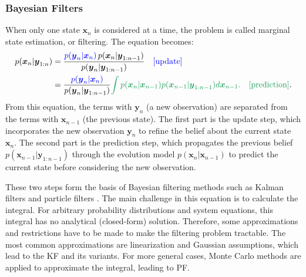 \subsubsection{Bayesian Filters}
\label{sec:bayesfilter}
When only one state $\boldsymbol{x}_{n}$ is considered at a time, the problem is called marginal state estimation, or filtering. The equation becomes:
\begin{equation}
    \label{eq:bayesfilter}
    \begin{split}
        p(\boldsymbol{x}_{n}|\boldsymbol{y}_{1:n})&=\frac{\textcolor{blue}{p(\boldsymbol{y}_n|\boldsymbol{x}_n)}\,p(\boldsymbol{x}_{n}|\boldsymbol{y}_{1:n-1})}{p(\boldsymbol{y}_n|\boldsymbol{y}_{1:n-1})} \quad\text{\textcolor{blue}{[update]}}\\
        &=\frac{\textcolor{blue}{p(\boldsymbol{y}_n|\boldsymbol{x}_n)}}{p(\boldsymbol{y}_n|\boldsymbol{y}_{1:n-1})}\textcolor{ForestGreen}{\int p(\boldsymbol{x}_{n}|\boldsymbol{x}_{n-1})p(\boldsymbol{x}_{n-1}|\boldsymbol{y}_{1:n-1})d\boldsymbol{x}_{n-1}.} \quad\text{\textcolor{ForestGreen}{[prediction]}}.
    \end{split}
\end{equation}
From this equation, the terms with $\boldsymbol{y}_n$ (a new observation) are separated from the terms with $\boldsymbol{x}_{n-1}$ (the previous state). The first part is the update step, which incorporates the new observation $\boldsymbol{y}_n$ to refine the belief about the current state $\boldsymbol{x}_n$. The second part is the prediction step, which propagates the previous belief $p(\boldsymbol{x}_{n-1}|\boldsymbol{y}_{1:n-1})$ through the evolution model $p(\boldsymbol{x}_{n}|\boldsymbol{x}_{n-1})$ to predict the current state before considering the new observation. 

These two steps form the basis of Bayesian filtering methods such as Kalman filters and particle filters \citep{chen_bayesian_2003}. The main challenge in this equation is to calculate the integral. For arbitrary probability distributions and system equations, this integral has no analytical (closed-form) solution. Therefore, some approximations and restrictions have to be made to make the filtering problem tractable. The most common approximations are linearization and Gaussian assumptions, which lead to the \ac{KF} and its variants. For more general cases, Monte Carlo methods are applied to approximate the integral, leading to \ac{PF}.


